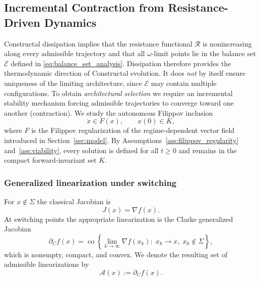 \documentclass[12pt]{article}
\theoremstyle{plain}
\theoremstyle{definition}
\theoremstyle{remark}
\begin{document}
\subsection{Incremental Contraction from Resistance-Driven Dynamics}
\label{subsec:contraction}

Constructal dissipation implies that the resistance functional
$\mathcal R$ is nonincreasing along every admissible trajectory and that
all $\omega$-limit points lie in the balance set
$\mathcal E$ defined in \eqref{eq:balance_set_analysis}.
Dissipation therefore provides the thermodynamic direction of
Constructal evolution. It does \emph{not} by itself ensure uniqueness of
the limiting architecture, since $\mathcal E$ may contain multiple
configurations. To obtain \emph{architectural selection} we require an
incremental stability mechanism forcing admissible trajectories to
converge toward one another (contraction). We study the autonomous Filippov inclusion
\begin{equation}
\dot x \in F(x),
\qquad x(0)\in K,
\label{eq:autonomous_filippov}
\end{equation}
where $F$ is the Filippov regularization of the regime-dependent vector
field introduced in Section~\ref{sec:model}.
By Assumptions~\ref{ass:filippov_regularity} and~\ref{ass:viability},
every solution is defined for all $t\ge 0$ and remains in the compact
forward-invariant set $K$.

\subsubsection*{Generalized linearization under switching}

For $x\notin\Sigma$ the classical Jacobian is
\begin{equation}
J(x)=\nabla f(x).
\label{eq:smooth_jacobian}
\end{equation}
At switching points the appropriate linearization is the Clarke
generalized Jacobian
\begin{equation}
\partial_C f(x)
=
\operatorname{co}\!\left\{
\lim_{k\to\infty}\nabla f(x_k)
:\; x_k\to x,\; x_k\notin\Sigma
\right\},
\label{eq:clarke_jacobian}
\end{equation}
which is nonempty, compact, and convex. We denote the resulting set of
admissible linearizations by
\begin{equation}
\mathcal A(x):=\partial_C f(x).
\label{eq:linearization_set}
\end{equation}
\end{document}
